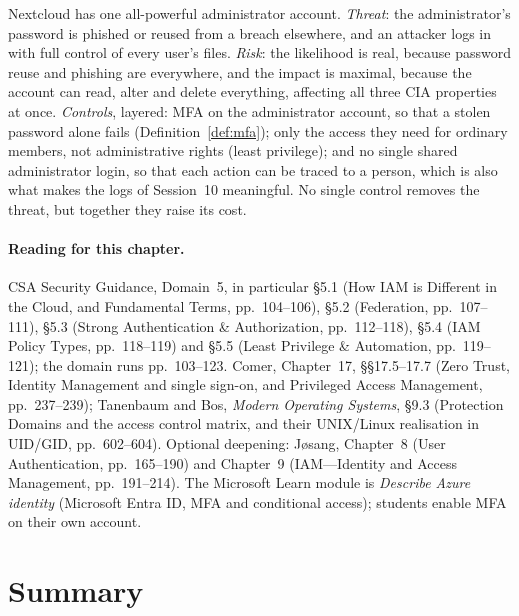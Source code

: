 \begin{example}\label{ex:mfa-trc}
Nextcloud has one all-powerful administrator account. \emph{Threat}: the administrator's password is phished or reused
from a breach elsewhere, and an attacker logs in with full control of every
user's files. \emph{Risk}: the likelihood is real, because password reuse and
phishing are everywhere, and the impact is maximal, because the account can
read, alter and delete everything, affecting all three CIA properties at once.
\emph{Controls}, layered: MFA on the administrator account, so that a
stolen password alone fails (Definition~\ref{def:mfa}); only the access they
need for ordinary members, not administrative rights (least privilege); and
no single shared administrator login, so that each action can be traced to
a person, which is also what makes the logs of Session~10 meaningful. No
single control removes the threat, but together they raise its cost.
\end{example}

\paragraph{Reading for this chapter.} CSA Security Guidance, Domain~5, in
particular \S5.1 (How IAM is Different in the Cloud, and Fundamental Terms,
pp.~104--106), \S5.2 (Federation, pp.~107--111), \S5.3 (Strong Authentication
\& Authorization, pp.~112--118), \S5.4 (IAM Policy Types, pp.~118--119) and
\S5.5 (Least Privilege \& Automation, pp.~119--121); the domain runs
pp.~103--123. Comer, Chapter~17, \S\S17.5--17.7 (Zero Trust, Identity
Management and single sign-on, and Privileged Access Management,
pp.~237--239); Tanenbaum and Bos, \emph{Modern Operating Systems}, \S9.3
(Protection Domains and the access control matrix, and their UNIX/Linux
realisation in UID/GID, pp.~602--604). Optional deepening: J\o sang,
Chapter~8 (User Authentication, pp.~165--190) and Chapter~9 (IAM---Identity
and Access Management, pp.~191--214). The Microsoft Learn module is \emph{Describe Azure identity}
(Microsoft Entra ID, MFA and conditional access); students enable MFA on their
own account.

\section{Summary}

